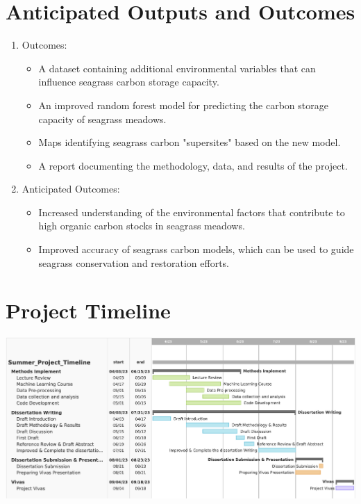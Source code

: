 \documentclass[a4paper]{report}
\begin{document}
\section{Anticipated Outputs and Outcomes}
\begin{enumerate}[1]
\item Outcomes:
\begin{itemize}
    \item A dataset containing additional environmental variables that can influence seagrass carbon storage capacity.
    \item An improved random forest model for predicting the carbon storage capacity of seagrass meadows.
    \item Maps identifying seagrass carbon "supersites" based on the new model.
    \item A report documenting the methodology, data, and results of the project.
\end{itemize}

\item Anticipated Outcomes:
\begin{itemize}
    \item Increased understanding of the environmental factors that contribute to high organic carbon stocks in seagrass meadows.
    \item Improved accuracy of seagrass carbon models, which can be used to guide seagrass conservation and restoration efforts.

\end{itemize}

\end{enumerate}

\section{Project Timeline}
\includegraphics[scale=0.5]{../data/Gantt.png}\\
\vspace{-0.7cm}
\end{document}
